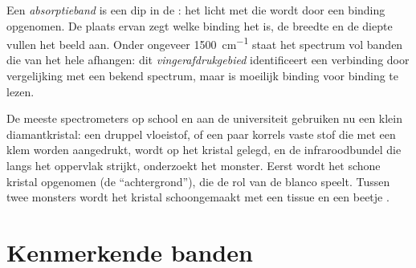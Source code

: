 \begin{definition}\label{def:g11:infrared:band}
Een \emph{absorptieband} is een dip in de
: het licht met die  wordt door een binding
opgenomen. De plaats ervan zegt welke binding het is, de breedte en de
diepte vullen het beeld aan. Onder ongeveer \qty{1500}{cm^{-1}} staat het
spectrum vol banden die van het hele  afhangen: dit
\emph{vingerafdrukgebied} identificeert een
verbinding door vergelijking met een bekend spectrum, maar is moeilijk
binding voor binding te lezen.
\end{definition}

\begin{inthelab}
De meeste spectrometers op school en aan de universiteit gebruiken nu een
klein diamantkristal: een druppel vloeistof, of een paar korrels vaste
stof die met een klem worden aangedrukt, wordt op het kristal gelegd, en
de infraroodbundel die langs het oppervlak strijkt, onderzoekt het
monster. Eerst wordt het schone kristal opgenomen (de
``achtergrond''), die de rol van de blanco speelt. Tussen twee monsters
wordt het kristal schoongemaakt met een tissue en een beetje
.
\end{inthelab}

\section{Kenmerkende banden}

